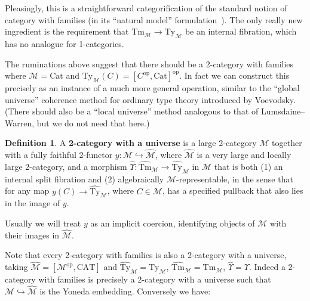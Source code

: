 \documentclass[10pt]{article}
\theoremstyle{definition}
\newtheorem{definition}{Definition}
\newcommand\op{^{\mathrm{op}}}
\newcommand\Cat{\mathrm{Cat}}
\newcommand\CAT{\mathrm{CAT}}
\newcommand\M{\mathcal{M}}
\newcommand\Mhat{\widehat{\mathcal{M}}}
\newcommand\Mty{{\mathrm{Ty}_{\M}}}
\newcommand\Mtm{{\mathrm{Tm}_{\M}}}
\newcommand\Mtyhat{{\widehat{\mathrm{Ty}}_{\M}}}
\newcommand\Mtmhat{{\widehat{\mathrm{Tm}}_{\M}}}
\newcommand\Ups{\Upsilon}
\newcommand\Upshat{{\widehat{\Upsilon}}}
\begin{document}
Pleasingly, this is a straightforward categorification of the standard notion of category with families (in its ``natural model'' formulation~\cite{awodey:natural-models}).
The only really new ingredient is the requirement that $\Mtm\to \Mty$ be an internal fibration, which has no analogue for 1-categories.

The ruminations above suggest that there should be a 2-category with families where $\M=\Cat$ and $\Mty(C) = [C\op,\Cat]\op$.
In fact we can construct this precisely as an instance of a much more general operation, similar to the ``global universe'' coherence method for ordinary type theory introduced by Voevodsky.
(There should also be a ``local universe'' method analogous to that of Lumsdaine--Warren, but we do not need that here.)

\begin{definition}
  A \textbf{2-category with a universe} is a large 2-category $\M$ together with a fully faithful 2-functor $y:\M \hookrightarrow \Mhat$, where $\Mhat$ is a very large and locally large 2-category, and a morphism $\Upshat : \Mtmhat \to \Mtyhat$ in $\Mhat$ that is both (1) an internal split fibration and (2) algebraically $\M$-representable, in the sense that for any map $y(C)\to \Mtyhat$, where $C\in \M$, has a specified pullback that also lies in the image of $y$.
\end{definition}

Usually we will treat $y$ as an implicit coercion, identifying objects of $\M$ with their images in $\Mhat$.

Note that every 2-category with families is also a 2-category with a universe, taking $\Mhat = [\M\op,\CAT]$ and $\Mtyhat=\Mty$, $\Mtmhat = \Mtm$, $\Upshat = \Ups$.
Indeed a 2-category with families is precisely a 2-category with a universe such that $\M \hookrightarrow \Mhat$ is the Yoneda embedding.
Conversely we have:
\end{document}
